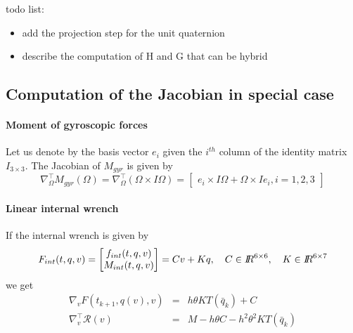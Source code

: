 \begin{ndrva}

  todo list:

  \begin{itemize}


  \item add the projection step for the unit quaternion

  \item describe the computation of H and G that can be hybrid


\end{itemize}

\end{ndrva}


\subsection{Computation of the Jacobian in special case}

\paragraph{Moment of gyroscopic forces}
Let us denote by the basis vector $e_i$ given the $i^{th}$ column of the identity matrix $I_{3\times3}$. The Jacobian of $M_{gyr}$ is given by
\begin{equation}
  \label{eq:112}
  \nabla^\top_\Omega M_{gyr}(\Omega) = \nabla^\top_\Omega (\Omega \times I \Omega) =
  \begin{bmatrix}
    e_i \times I \Omega + \Omega \times I e_i, i =1,2,3
  \end{bmatrix}
\end{equation}

\paragraph{Linear internal wrench}
If the internal wrench  is given by
\begin{equation}
  \label{eq:113}
  F_{int}(t,q,v) =
  \begin{bmatrix}
    f_{int}(t,q,v)\\
    M_{int}(t,q,v)
  \end{bmatrix}
  = C v + K q, \quad C \in \mbox{\rm $I\!\!R$}^{6\times 6}, \quad K \in \mbox{\rm $I\!\!R$}^{6\times 7 }
\end{equation}
we get
\begin{equation}
  \label{eq:114}
  \begin{array}{lcl}
    \nabla_v F(t_{k+1}, q(v),v)  &=& h \theta K T(\bar q_k) + C \\
    \nabla^\top_v \mathcal R(v) &=& M - h \theta C - h^2 \theta^2 K T(\bar q_k)
  \end{array}
\end{equation}

